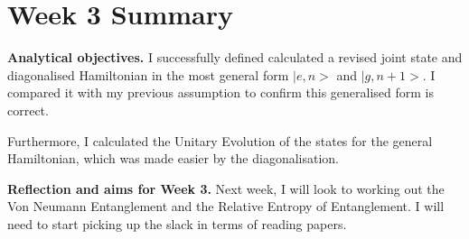 \documentclass{article}
\begin{document}
\section*{Week 3 Summary}

\vspace{0.5cm}

\textbf{Analytical objectives.} I successfully defined calculated a revised joint state and diagonalised Hamiltonian in the most general form $|e,n>$ and $|g,n+1>$. I compared it with my previous assumption to confirm this generalised form is correct. 

Furthermore, I calculated the Unitary Evolution of the states for the general Hamiltonian, which was made easier by the diagonalisation. 
    
\textbf{Reflection and aims for Week 3.} Next week, I will look to working out the Von Neumann Entanglement and the Relative Entropy of Entanglement. I will need to start picking up the slack in terms of reading papers. 
\end{document}

